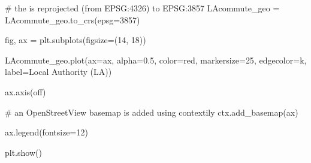 \documentclass[
  number]{elsarticle}
\newenvironment{Shaded}{\begin{snugshade}}{\end{snugshade}}
\newcommand{\CommentTok}[1]{\textcolor[rgb]{0.37,0.37,0.37}{#1}}
\newcommand{\DecValTok}[1]{\textcolor[rgb]{0.68,0.00,0.00}{#1}}
\newcommand{\FloatTok}[1]{\textcolor[rgb]{0.68,0.00,0.00}{#1}}
\newcommand{\NormalTok}[1]{\textcolor[rgb]{0.00,0.23,0.31}{#1}}
\newcommand{\OperatorTok}[1]{\textcolor[rgb]{0.37,0.37,0.37}{#1}}
\newcommand{\StringTok}[1]{\textcolor[rgb]{0.13,0.47,0.30}{#1}}
\begin{document}
\begin{Shaded}
\begin{Highlighting}[]
\CommentTok{\# the is reprojected (from EPSG:4326) to EPSG:3857}
\NormalTok{LAcommute\_geo }\OperatorTok{=}\NormalTok{ LAcommute\_geo.to\_crs(epsg}\OperatorTok{=}\DecValTok{3857}\NormalTok{)}

\NormalTok{fig, ax }\OperatorTok{=}\NormalTok{ plt.subplots(figsize}\OperatorTok{=}\NormalTok{(}\DecValTok{14}\NormalTok{, }\DecValTok{18}\NormalTok{))}

\NormalTok{LAcommute\_geo.plot(ax}\OperatorTok{=}\NormalTok{ax, alpha}\OperatorTok{=}\FloatTok{0.5}\NormalTok{, color}\OperatorTok{=}\StringTok{\textquotesingle{}red\textquotesingle{}}\NormalTok{, markersize}\OperatorTok{=}\DecValTok{25}\NormalTok{, edgecolor}\OperatorTok{=}\StringTok{\textquotesingle{}k\textquotesingle{}}\NormalTok{,}
\NormalTok{               label}\OperatorTok{=}\StringTok{\textquotesingle{}Local Authority (LA)\textquotesingle{}}\NormalTok{)}

\NormalTok{ax.axis(}\StringTok{\textquotesingle{}off\textquotesingle{}}\NormalTok{)}

\CommentTok{\# an OpenStreetView basemap is added using contextily}
\NormalTok{ctx.add\_basemap(ax)}

\NormalTok{ax.legend(fontsize}\OperatorTok{=}\DecValTok{12}\NormalTok{)}

\NormalTok{plt.show()}
\end{Highlighting}
\end{Shaded}
\end{document}
